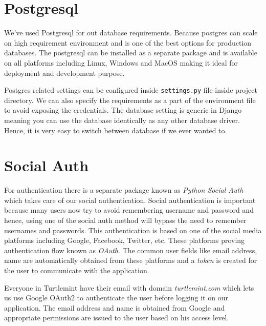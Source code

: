 \section{Postgresql}
We've used Postgresql for out database requirements. Because postgres can
scale on high requirement environment and is one of the best options for
production databases. The postgresql can be installed as a separate package
and is available on all platforms including Linux, Windows and MacOS making
it ideal for deployment and development purpose.

Postgres related settings can be configured inside \texttt{settings.py} file
inside project directory. We can also specify the requirements as a part of the
environment file to avoid exposing the credentials. The database setting is
generic in Django meaning you can use the database identically as any other
database driver. Hence, it is very easy to switch between database if we ever
wanted to.

\section{Social Auth}
For authentication there is a separate package known as
\textit{Python Social Auth} which takes care of our social authentication.
Social authentication is important because many users now try to avoid
remembering username and password and hence, using one of the social auth
method will bypass the need to remember usernames and passwords. This
authentication is based on one of the social media platforms including Google,
Facebook, Twitter, etc. These platforms proving authentication flow known as
\textit{OAuth}. The common user fields like email address, name are
automatically obtained from these platforms and a \textit{token} is created
for the user to communicate with the application.

Everyone in Turtlemint have their email with domain \textit{turtlemint.com}
which lets us use Google OAuth2 to authenticate the user before logging it
on our application. The email address and name is obtained from Google and
appropriate permissions are issued to the user based on his access level.
